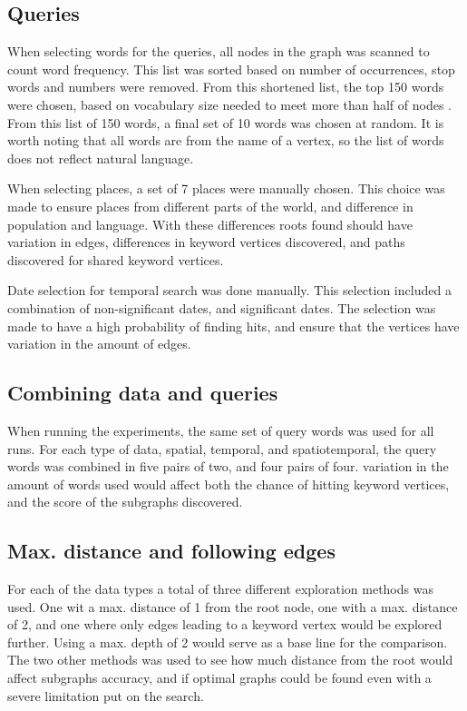 \subsection{Queries}
When selecting words for the queries, all nodes in the graph was scanned to count word frequency. This list was sorted based on number of occurrences, stop words and numbers were removed. From this shortened list, the top 150 words were chosen, based on vocabulary size needed to meet more than half of nodes \cite{zipf,worthington1996using}. From this list of 150 words, a final set of 10 words was chosen at random. It is worth noting that all words are from the name of a vertex, so the list of words does not reflect natural language.

When selecting places, a set of 7 places were manually chosen. This choice was made to ensure places from different parts of the world, and difference in population and language. With these differences roots found should have variation in edges, differences in keyword vertices discovered, and paths discovered for shared keyword vertices.

Date selection for temporal search was done manually. This selection included a combination of non-significant dates, and significant dates. The selection was made to have a high probability of finding hits, and ensure that the vertices have variation in the amount of edges.

\subsection{Combining data and queries}
When running the experiments, the same set of query words was used for all runs. For each type of data, spatial, temporal, and spatiotemporal, the query words was combined in five pairs of two, and four pairs of four. variation in the amount of words used would affect both the chance of hitting keyword vertices, and the score of the subgraphs discovered.

\subsection{Max. distance and following edges}
For each of the data types a total of three different exploration methods was used. One wit a max. distance of 1 from the root node, one with a max. distance of 2, and one where only edges leading to a keyword vertex would be explored further. Using a max. depth of 2 would serve as a base line for the comparison. The two other methods was used to see how much distance from the root would affect subgraphs accuracy, and if optimal graphs could be found even with a severe limitation put on the search.

